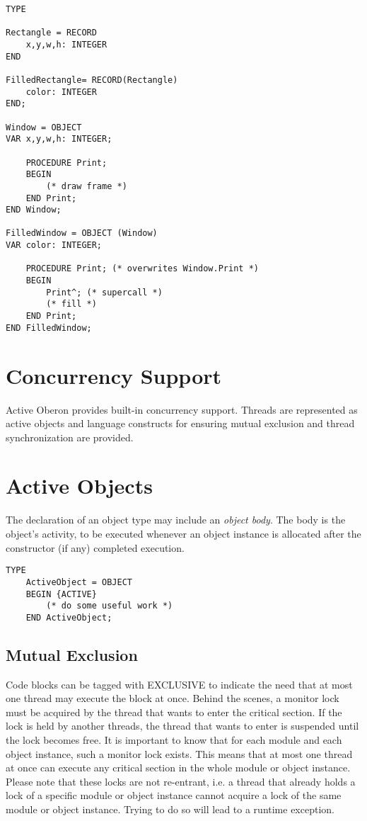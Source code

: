 \documentclass[a4paper,11pt]{article}
\begin{document}
\begin{lstlisting}[language=Oberon,frame=none]
TYPE

Rectangle = RECORD
    x,y,w,h: INTEGER
END

FilledRectangle= RECORD(Rectangle)
    color: INTEGER
END;

Window = OBJECT
VAR x,y,w,h: INTEGER;

    PROCEDURE Print;
    BEGIN
        (* draw frame *)
    END Print;
END Window;

FilledWindow = OBJECT (Window)
VAR color: INTEGER;

    PROCEDURE Print; (* overwrites Window.Print *)
    BEGIN
        Print^; (* supercall *)
        (* fill *)
    END Print;
END FilledWindow;

\end{lstlisting}



\section{Concurrency Support}
Active Oberon provides built-in concurrency support. Threads are represented as active objects and language constructs for ensuring mutual exclusion and thread synchronization are provided.

\section{Active Objects}
The declaration of an object type may include an \emph{object body}. The body is the object's activity, to be executed whenever an object instance is allocated after the constructor (if any) completed execution.

\begin{lstlisting}[language=Oberon,frame=none]
TYPE
    ActiveObject = OBJECT
    BEGIN {ACTIVE}
        (* do some useful work *)
    END ActiveObject;
\end{lstlisting}

\subsection{Mutual Exclusion}
Code blocks can be tagged with {EXCLUSIVE} to indicate the need that at most one thread may execute the block at once.
Behind the scenes, a monitor lock must be acquired by the thread that wants to enter the critical section. If the lock is held by another threads, the thread that wants to enter is suspended until the lock becomes free.
It is important to know that for each module and each object instance, such a monitor lock exists. This means that at
most one thread at once can execute any critical section in the whole module or object instance.
Please note that these locks are not re-entrant, i.e. a thread that already holds a lock of a specific module or object instance cannot acquire a lock of the same module or object instance. Trying to do so will lead to a runtime exception.
\end{document}
